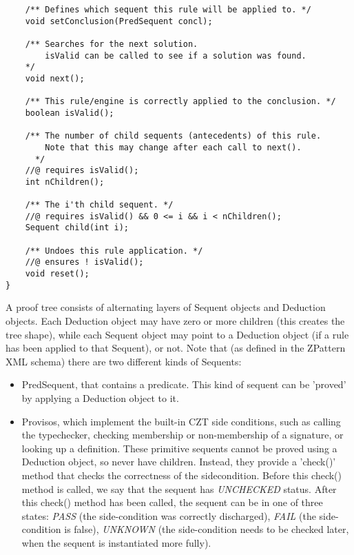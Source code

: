\documentclass{article}
\begin{document}
\begin{enumerate}
\begin{verbatim}
    /** Defines which sequent this rule will be applied to. */
    void setConclusion(PredSequent concl);

    /** Searches for the next solution.
        isValid can be called to see if a solution was found.
    */
    void next();

    /** This rule/engine is correctly applied to the conclusion. */
    boolean isValid();

    /** The number of child sequents (antecedents) of this rule.
        Note that this may change after each call to next().
      */
    //@ requires isValid();
    int nChildren();

    /** The i'th child sequent. */
    //@ requires isValid() && 0 <= i && i < nChildren();
    Sequent child(int i);

    /** Undoes this rule application. */
    //@ ensures ! isValid();
    void reset();
}
\end{verbatim}

  A proof tree consists of alternating layers of Sequent objects
  and Deduction objects.  Each Deduction object may have zero or more
  children (this creates the tree shape), while each Sequent object
  may point to a Deduction object (if a rule has been applied to that Sequent),
  or not.  Note that (as defined in the ZPattern XML schema) there
  are two different kinds of Sequents:
  \begin{itemize}
  \item PredSequent, that contains a predicate.  This kind of sequent
    can be 'proved' by applying a Deduction object to it.
    
  \item Provisos, which implement the built-in CZT side conditions,
    such as calling the typechecker, checking membership or non-membership
    of a signature, or looking up a definition.  These primitive
    sequents cannot be proved using a Deduction object, so never have
    children.  Instead, they provide a 'check()' method that checks
    the correctness of the sidecondition.  Before this check() method
    is called, we say that the sequent has \emph{UNCHECKED} status.
    After this check() method
    has been called, the sequent can be in one of three states:
    \emph{PASS} (the side-condition was correctly discharged),
    \emph{FAIL} (the side-condition is false),
    \emph{UNKNOWN} (the side-condition needs to be checked later,
    when the sequent is instantiated more fully). 
  \end{itemize}


\end{enumerate}
\end{document}

